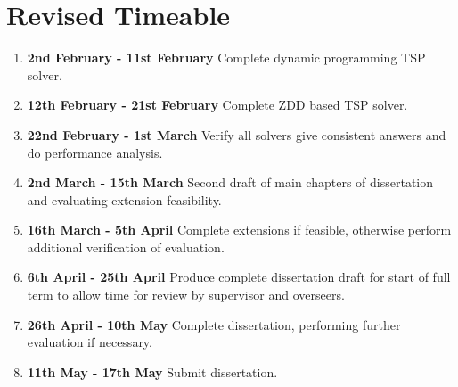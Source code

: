 \documentclass[12pt,a4paper,twoside]{article}
\begin{document}
\section*{Revised Timeable}

\begin{enumerate}

\item \textbf{2nd February - 11st February} Complete dynamic programming TSP solver.

\item \textbf{12th February - 21st February} Complete ZDD based TSP solver.

\item \textbf{22nd February - 1st March} Verify all solvers give consistent answers and do performance analysis.

\item \textbf{2nd March - 15th March} Second draft of main chapters of dissertation and evaluating extension feasibility.

\item \textbf{16th March - 5th April} Complete extensions if feasible, otherwise perform additional verification of evaluation.

\item \textbf{6th April - 25th April} Produce complete dissertation draft for start of full term to allow time for review by supervisor and overseers.

\item \textbf{26th April - 10th May}  Complete dissertation, performing further evaluation if necessary.

\item \textbf{11th May - 17th May} Submit dissertation.

\end{enumerate}
\end{document}
